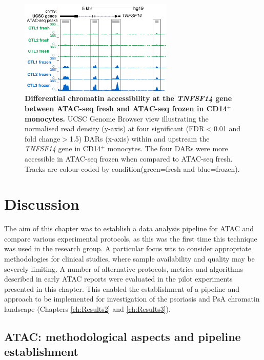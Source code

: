 	
\begin{figure}[htbp]
\centering
\includegraphics[width=0.65\textwidth]{./Results1/pdfs/Core_CD14_TNFSF14_track_UCSC}
\caption[Differential chromatin accessibility at the \textit{TNFSF14} gene between ATAC-seq fresh and ATAC-seq frozen in CD14$^+$ monocytes.]{\textbf{Differential chromatin accessibility at the \textit{TNFSF14} gene between ATAC-seq fresh and ATAC-seq frozen in CD14$^+$ monocytes.} UCSC Genome Browser view illustrating the normalised read density (y-axis) at four significant (FDR$<$0.01 and fold change$>$1.5) DARs (x-axis) within and upstream the \textit{TNFSF14} gene in CD14$^+$ monocytes. The four DARs were more accessible in ATAC-seq frozen when compared to ATAC-seq fresh. Tracks are colour-coded by condition(green=fresh and blue=frozen).}
\label{figure:Core_CD14_differential_TNFSF14}
\end{figure} 	






\section{Discussion}

The aim of this chapter was to establish a data analysis pipeline for ATAC and compare various experimental protocols, as this was the first time this technique was used in the research group. A particular focus was to consider appropriate methodologies for clinical studies, where sample availability and quality may be severely limiting. A number of alternative protocols, metrics and algorithms described in early ATAC reports were evaluated in the pilot experiments presented in this chapter. This enabled the establishment of a pipeline and approach to be implemented for investigation of the psoriasis and PsA chromatin landscape (Chapters \ref{ch:Results2} and \ref{ch:Results3}).

\subsection{ATAC: methodological aspects and pipeline establishment}

